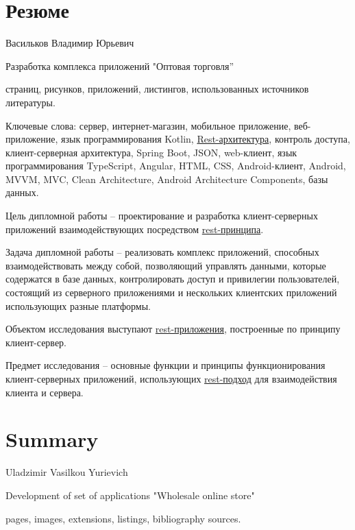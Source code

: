 \pagestyle{empty}
\section*{Резюме}\label{sec:cw-ru}\indent

Васильков Владимир Юрьевич

Разработка комплекса приложений "Оптовая торговля”

\pageref{LastPage} страниц,  рисунков,  приложений,  листингов,  использованных источников литературы.

Ключевые слова: сервер, интернет-магазин, мобильное приложение, веб-приложение, язык программирования Kotlin, \hyperlink{gloss:rest}{Rest-архитектура}, 
контроль доступа, клиент-серверная архитектура, Spring Boot, JSON, web-клиент, язык программирования TypeScript, Angular, HTML, CSS, Android-клиент, 
Android, MVVM, MVC, Clean Architecture, Android Architecture Components, базы данных.

Цель дипломной работы – проектирование и разработка клиент-серверных приложений взаимодействующих посредством \hyperlink{gloss:rest}{rest-принципа}.

Задача дипломной работы – реализовать комплекс приложений, способных взаимодействовать между собой, 
позволяющий управлять данными, которые содержатся в базе данных, контролировать доступ и привилегии пользователей, 
состоящий из серверного приложениями и нескольких клиентских приложений использующих разные платформы.

Объектом исследования выступают \hyperlink{gloss:rest}{rest-приложения}, построенные по принципу клиент-сервер.

Предмет исследования – основные функции и принципы функционирования клиент-серверных приложений, использующих \hyperlink{gloss:rest}{rest-подход} для взаимодействия клиента и сервера.

\section*{Summary}\label{sec:cw-eng}\indent

Uladzimir Vasilkou Yurievich

Development of set of applications "Wholesale online store"

\pageref{LastPage} pages,  images,  extensions,  listings,  bibliography sources.

